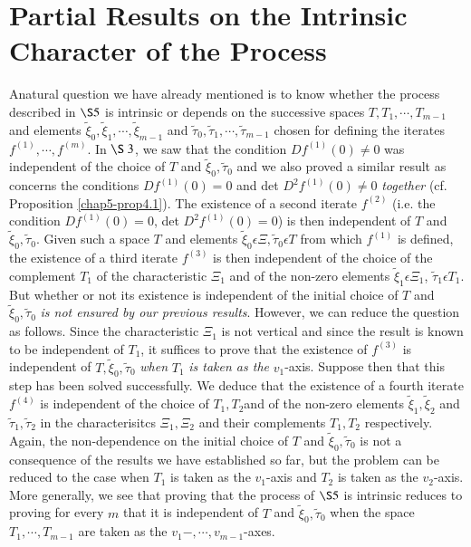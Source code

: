 \section{Partial Results on the Intrinsic Character of the Process}\label{chap5-sec6}

A\pageoriginale natural question we have already mentioned is to know whether the process described in $\S 5$ is intrinsic or depends on the successive spaces $T, T_{1}, \cdots, T_{m-1}$ and elements $\widetilde{\xi}_{0}, \widetilde{\xi}_{1}, \cdots , \widetilde{\xi}_{m-1}$ and $\widetilde{\tau}_{0}, \widetilde{\tau}_{1}, \cdots, \widetilde{\tau}_{m-1}$ chosen for defining the iterates $f^{(1)}, \cdots, f^{(m)}$. In $\S\ 3$, we saw that the condition $Df^{(1)} (0) \neq 0$ was independent of the choice of $T$ and $\widetilde{\xi}_{0}, \widetilde{\tau}_{0}$ and we also proved a similar result as concerns the conditions $Df^{(1)}(0) = 0$ and det $D^{2}f^{(1)}(0) \neq 0$ {\em together} (cf. Proposition \ref{chap5-prop4.1}). The existence of a second iterate $f^{(2)}$ (i.e. the condition $Df^{(1)} (0) = 0$, det $D^{2}f^{(1)} (0) = 0$) is then independent of $T$ and $\widetilde{\xi}_{0}, \widetilde{\tau}_{0}$. Given such a space $T$ and elements $\widetilde{\xi}_{0} \epsilon \Xi, \widetilde{\tau}_{0} \epsilon T$ from which $f^{(1)}$ is defined, the existence of a third iterate $f^{(3)}$ is then independent of the choice of the complement $T_{1}$ of the characteristic $\Xi_{1}$ and of the non-zero elements $\widetilde{\xi}_{1} \epsilon \Xi_{1}$, $\widetilde{\tau}_{1} \epsilon T_{1}$. But whether or not its existence is independent of the initial choice  of $T$ and $\widetilde{\xi}_{0}, \widetilde{\tau}_{0}$ {\em is not ensured by our previous results}. However, we can reduce the question as follows. Since the characteristic $\Xi_{1}$ is not vertical and since the result is known to be independent of $T_{1}$, it suffices to prove that the existence of $f^{(3)}$ is independent of $T, \widetilde{\xi}_{0}, \widetilde{\tau}_{0}$ {\em when} $T_{1}$ {\em is taken as the} $v_{1}$-axis. Suppose then that this step has been solved successfully. We deduce that the existence of a fourth iterate $f^{(4)}$ is independent of the choice of $T_{1}, T_{2}$\pageoriginale and of the non-zero elements $\widetilde{\xi}_{1}, \widetilde{\xi}_{2}$ and $\tilde{\tau}_1, \tilde{\tau}_2$ in the characterisitcs $\Xi_{1}, \Xi_{2}$ and their complements $T_{1}, T_{2}$ respectively. Again, the non-dependence on the initial choice of $T$ and $\widetilde{\xi}_{0}, \widetilde{\tau}_{0}$ is not a consequence of the results we have established so far, but the problem can be reduced to the case when $T_{1}$ is taken as the $v_{1}$-axis and $T_{2}$ is taken as the $v_{2}$-axis. More generally, we see that proving that the process of $\S 5$ is intrinsic reduces to proving for every $m$ that it is independent of $T$ and  $\widetilde{\xi}_{0}, \widetilde{\tau}_{0}$ when the space $T_{1}, \cdots, T_{m-1}$ are taken as the $v_{1} -, \cdots, v_{m-1}$-axes.

